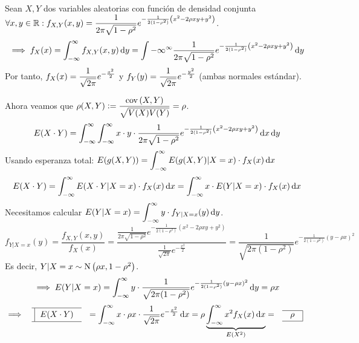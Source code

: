 \begin{ejem}
	Sean $X, Y$ dos variables aleatorias con función de densidad conjunta $\displaystyle \forall x, y \in \mathbb{R} : f_{X, Y}(x, y) = \frac{1}{2\pi \sqrt{1-\rho^2}} e^{-\frac{1}{2(1-\rho^2)}\left(x^2 - 2\rho x y + y^2\right)}$.
	\[\implies f_X(x) = \int_{-\infty}^{\infty} f_{X, Y}(x, y) \odif{y} = \int{-\infty}^{\infty} \frac{1}{2\pi \sqrt{1-\rho^2}} e^{-\frac{1}{2(1-\rho^2)}\left(x^2 - 2\rho x y + y^2\right)} \odif{y}\]
	Por tanto, $\displaystyle f_X(x) = \frac{1}{\sqrt{2\pi}} e^{-\frac{x^2}{2}}$ y $\displaystyle f_Y(y) = \frac{1}{\sqrt{2\pi}} e^{-\frac{y^2}{2}}$ (ambas normales estándar).

	Ahora veamos que $\displaystyle \rho(X, Y) \vcentcolon= \frac{\operatorname{cov}\left(X, Y\right)}{\sqrt{V(X) V(Y)}} = \rho$.
	\[E(X\cdot Y) = \int_{-\infty}^{\infty} \int_{-\infty}^{\infty} x\cdot y \cdot \frac{1}{2\pi \sqrt{1-\rho^2}} e^{-\frac{1}{2(1-\rho^2)}\left(x^2 - 2\rho x y + y^2\right)} \odif{x} \odif{y}\] %
	Usando esperanza total: $\ds E(g(X, Y)) = \int_{-\infty}^{\infty} E(g(X, Y) \vert X = x) \cdot f_X(x) \odif{x}$
	\[E(X\cdot Y) = \int_{-\infty}^{\infty} E(X\cdot Y \vert X = x) \cdot f_X(x) \odif{x} = \int_{-\infty}^{\infty} x \cdot E(Y \vert X = x) \cdot f_X(x) \odif{x}\]
	Necesitamos calcular $\ds E(Y \vert X = x) = \int_{-\infty}^{\infty} y \cdot f_{Y|X=x}(y) \odif{y}$.
	\[f_{Y|X=x}(y) = \frac{f_{X, Y}(x, y)}{f_X(x)} = \frac{\frac{1}{2\pi \sqrt{1-\rho^2}} e^{-\frac{1}{2(1-\rho^2)}\left(x^2 - 2\rho x y + y^2\right)}}{\frac{1}{\sqrt{2\pi}} e^{-\frac{x^2}{2}}} = \frac{1}{\sqrt{2\pi(1-\rho^2)}} e^{-\frac{1}{2(1-\rho^2)}\left(y-\rho x\right)^2}\]
	Es decir, $Y \vert X = x \sim \operatorname{N}\left(\rho x, 1-\rho^2\right)$.
	\[\implies E(Y \vert X = x) = \int_{-\infty}^{\infty} y \cdot \frac{1}{\sqrt{2\pi(1-\rho^2)}} e^{-\frac{1}{2(1-\rho^2)}\left(y-\rho x\right)^2} \odif{y} = \rho x\]
	\[\implies \lbox{E(X\cdot Y)} = \int_{-\infty}^{\infty} x \cdot \rho x \cdot \frac{1}{\sqrt{2\pi}} e^{-\frac{x^2}{2}} \odif{x} = \rho \underbrace{\int_{-\infty}^{\infty} x^2 f_X(x) \odif{x}}_{E\left(X^2\right)} = \rbox{\rho}\]

\end{ejem}